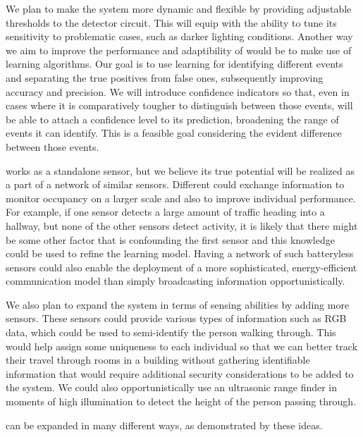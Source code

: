  We plan to make the system more dynamic and flexible by providing adjustable thresholds to the detector circuit.
This will equip \sysname with the ability to tune its sensitivity to problematic cases, such as darker lighting conditions.
Another way we aim to improve the performance and adaptibility of \sysname would be to make use of learning algorithms.
Our goal is to use learning for identifying different events and separating the true positives from false ones, subsequently improving accuracy and precision.
We will introduce confidence indicators so that, even in cases where it is comparatively tougher to distinguish between those events, \sysname will be able to attach a confidence level to its prediction, broadening the range of events it can identify.
This is a feasible goal considering the evident difference between those events.

\sysname works as a standalone sensor, but we believe its true potential will be realized as a part of a network of similar sensors.
Different \sysnames could exchange information to monitor occupancy on a larger scale and also to improve individual performance.
For example, if one sensor detects a large amount of traffic heading into a hallway, but none of the other sensors detect activity, it is likely that there might be some other factor that is confounding the first sensor and this knowledge could be used to refine the learning model.
Having a network of such batteryless sensors could also enable the deployment of a more sophisticated, energy-efficient communication model than simply broadcasting information opportunistically.

 We also plan to expand the system in terms of sensing abilities by adding more sensors.
These sensors could provide various types of information such as RGB data, which could be used to semi-identify the person walking through.
This would help assign some uniqueness to each individual so that we can better track their travel through rooms in a building without gathering identifiable information that would require additional security considerations to be added to the system.
We could also opportunistically use an ultrasonic range finder in moments of high illumination to detect the height of the person passing through.

\sysname can be expanded in many different ways, as demonstrated by these ideas.



